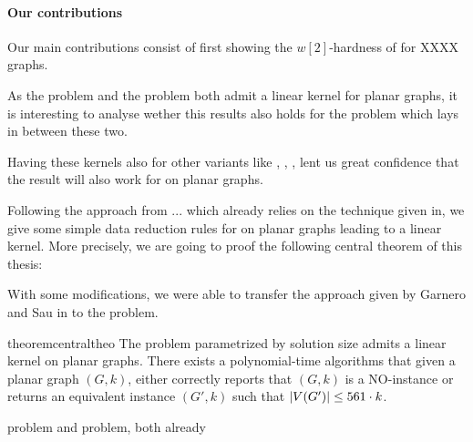 \paragraph{Our contributions}

Our main contributions consist of first showing the $w[2]$-hardness of \sdom for XXXX graphs.

\noindent As the \dom problem and the \tdom problem both admit a linear kernel for planar graphs, it is interesting to analyse wether this results also holds for the \sdom problem which lays in between these two. 

Having these kernels also for other variants like \eddom, \efdom, \cdom, \rbdom lent us great confidence that the result will also work for \sdom on planar graphs.


Following the approach from ... which already relies on the technique given in, we give some simple data reduction rules for \sdom on planar graphs leading to a linear kernel. More precisely, we are going to proof the following central theorem of this thesis:

With some modifications, we were able to transfer the approach given by Garnero and Sau in \cite{Garnero2018} to the \sdom problem.

\begin{restatable}[]{theorem}{centraltheo}\label{thm:central}
    The \sdom problem parametrized by solution size admits a linear kernel on planar graphs. There exists a polynomial-time algorithms that given a planar graph $(G, k)$, either correctly reports that $(G, k)$ is a NO-instance or returns an equivalent instance $(G', k)$ such that $\abs{V(G')} \leq 561 \cdot k$.
\end{restatable}

\dom problem and \tdom problem, both already 

